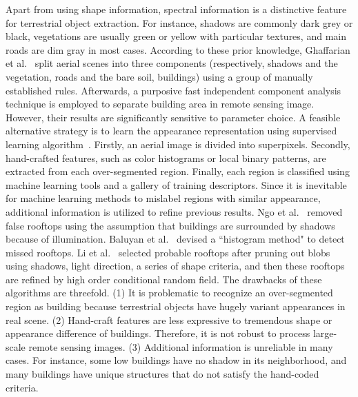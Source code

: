 Apart from using shape information, spectral information is a distinctive feature for terrestrial object extraction. For instance, shadows are commonly dark grey or black, vegetations are usually green or yellow with particular textures, and main roads are dim gray in most cases. According to these prior knowledge, Ghaffarian et al.~\cite{ghaffarian2014automaticPFICA} split aerial scenes into three components (respectively, shadows and the vegetation, roads and the bare soil, buildings) using a group of manually established rules. Afterwards, a purposive fast independent component analysis technique is employed to separate building area in remote sensing image. However, their results are significantly sensitive to parameter choice. A feasible alternative strategy is to learn the appearance representation using supervised learning algorithm~\cite{chen2014shadow,ngoautomatic,baluyan2013novel,dornaika2015object}. Firstly, an aerial image is divided into superpixels. Secondly, hand-crafted features, such as color histograms or local binary patterns, are extracted from each over-segmented region. Finally, each region is classified using machine learning tools and a gallery of training descriptors. Since it is inevitable for machine learning methods to mislabel regions with similar appearance, additional information is utilized to refine previous results. 
Ngo et al.~\cite{ngoautomatic} removed false rooftops using the assumption that buildings are surrounded by shadows because of illumination. Baluyan et al.~\cite{baluyan2013novel} devised a ``histogram method" to detect missed rooftops. Li et al.~\cite{li2015robust} selected probable rooftops after pruning out blobs using shadows, light direction, a series of shape criteria, and then these rooftops are refined by high order conditional random field. 
The drawbacks of these algorithms are threefold. 
(1) It is problematic to recognize an over-segmented region as building because terrestrial objects have hugely variant appearances in  real scene.
	(2) Hand-craft features are less expressive to tremendous shape or appearance difference of buildings. Therefore, it is not robust to process large-scale remote sensing images. 
(3) Additional information is unreliable in many cases. For instance, some low buildings have no shadow in its neighborhood, and many buildings have unique structures that do not satisfy the hand-coded criteria. 

